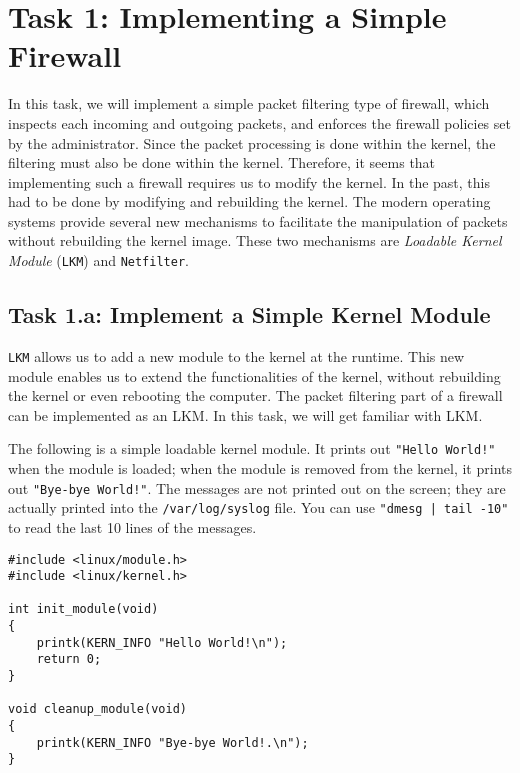 \section{Task 1: Implementing a Simple Firewall} 


In this task, we will implement a simple packet filtering 
type of firewall, which 
inspects each incoming and outgoing packets, and enforces the firewall policies 
set by the administrator. Since the packet 
processing is done within the kernel, the filtering must also be 
done within the kernel. Therefore, it seems that implementing such
a firewall requires us to modify the \linux kernel. In the past, 
this had to be done by modifying and rebuilding 
the kernel. The modern \linux 
operating systems provide several new mechanisms 
to facilitate the manipulation of packets without rebuilding
the kernel image. These two mechanisms are 
\textit{Loadable Kernel Module} (\texttt{LKM}) and \texttt{Netfilter}.



\subsection{Task 1.a: Implement a Simple Kernel Module}


{\tt LKM} allows us to add a new module to the kernel at the runtime. 
This new module enables us to extend the functionalities of the kernel,
without rebuilding the kernel or even rebooting the computer. 
The packet filtering part of a firewall can be implemented as an LKM. 
In this task, we will get familiar with LKM.


The following is a simple loadable kernel module. It prints out 
\texttt{"Hello World!"} when the module is loaded; when the module
is removed from the kernel, it prints out \texttt{"Bye-bye World!"}.
The messages are not printed out on the screen; they are 
actually printed into the \texttt{/var/log/syslog} file. You can
use \texttt{"dmesg | tail -10"} to read the last 10 lines of 
the messages. 


\begin{lstlisting}
#include <linux/module.h>
#include <linux/kernel.h>

int init_module(void)
{
    printk(KERN_INFO "Hello World!\n");
    return 0;
}

void cleanup_module(void)
{
    printk(KERN_INFO "Bye-bye World!.\n");
}
\end{lstlisting}

